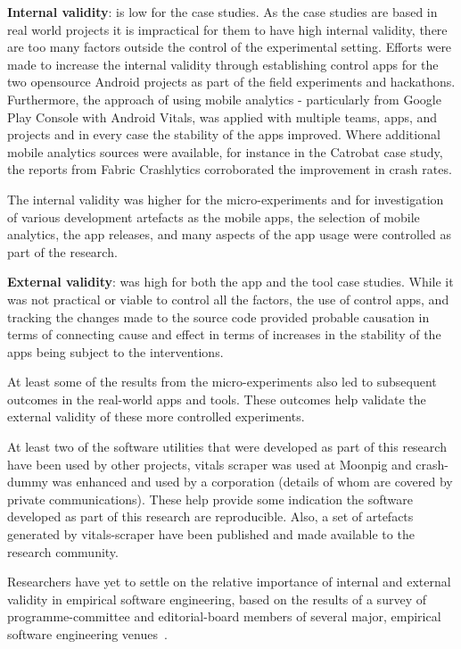 \textbf{Internal validity}: is low for the case studies. As the case studies are based in real world projects it is impractical for them to have high internal validity, there are too many factors outside the control of the experimental setting. Efforts were made to increase the internal validity through establishing control apps for the two opensource Android projects as part of the field experiments and hackathons. Furthermore, the approach of using mobile analytics - particularly from Google Play Console with Android Vitals, was applied with multiple teams, apps, and projects and in every case the stability of the apps improved. Where additional mobile analytics sources were available, for instance in the Catrobat case study, the reports from Fabric Crashlytics corroborated the improvement in crash rates.

The internal validity was higher for the micro-experiments and for investigation of various development artefacts as the mobile apps, the selection of mobile analytics, the app releases, and many aspects of the app usage were controlled as part of the research.

\textbf{External validity}: was high for both the app and the tool case studies. While it was not practical or viable to control all the factors, the use of control apps, and tracking the changes made to the source code provided probable causation in terms of connecting cause and effect in terms of increases in the stability of the apps being subject to the interventions.

At least some of the results from the micro-experiments also led to subsequent outcomes in the real-world apps and tools. These outcomes help validate the external validity of these more controlled experiments. 

At least two of the software utilities that were developed as part of this research have been used by other projects, vitals scraper was used at Moonpig and crash-dummy was enhanced and used by a corporation (details of whom are covered by private communications). These help provide some indication the software developed as part of this research are reproducible. Also, a set of artefacts generated by vitals-scraper have been published and made available to the research community. 

Researchers have yet to settle on the relative importance of internal and external validity in empirical software engineering, based on the results of a survey of programme-committee and editorial-board members of several major, empirical software engineering venues~\citep[p.4]{sigmund2015_views_on_internal_and_external_validity_in_ESE}. %



